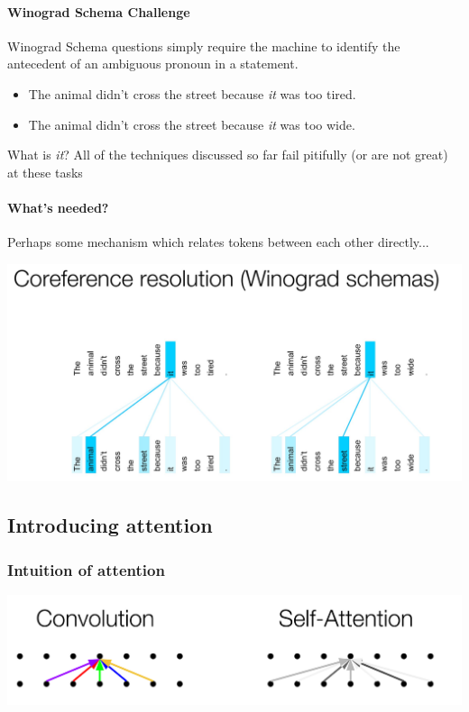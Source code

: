 \documentclass{article}
\begin{document}
    \paragraph{Winograd Schema Challenge} Winograd Schema questions simply require the machine to identify the antecedent of an ambiguous pronoun in a statement. 

    \begin{itemize}
        \item The animal didn't cross the street because \emph{it} was too tired.
        \item The animal didn't cross the street because \emph{it} was too wide.
    \end{itemize}

    What is \emph{it}?
    All of the techniques discussed so far fail pitifully (or are not great) at these tasks

    \paragraph{What's needed?} Perhaps some mechanism which relates tokens between each other directly...

    \includegraphics[angle=-90,origin=c,scale=0.1]{fig1.png}

    \subsection{Introducing attention}
    \subsubsection{Intuition of attention}

    \includegraphics[scale=0.16]{fig2.png}
\end{document}
